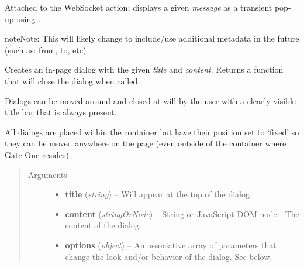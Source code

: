 \documentclass[letterpaper,10pt,openany]{sphinxmanual}
\begin{document}
\begin{fulllineitems}
\begin{fulllineitems}
\begin{fulllineitems}
\end{fulllineitems}



\begin{fulllineitems}
\label{Developer/js_gateone:GateOne.Visual.userMessageAction}
Attached to the  WebSocket action; displays a given \emph{message} as a transient pop-up using {\hyperref[Developer/js_gateone:GateOne.Visual.displayMessage]{}}.

\begin{notice}{note}{Note:}
This will likely change to include/use additional metadata in the future (such as: from, to, etc)
\end{notice}

\end{fulllineitems}



\begin{fulllineitems}
\label{Developer/js_gateone:GateOne.Visual.dialog}
Creates an in-page dialog with the given \emph{title} and \emph{content}.  Returns a function that will close the dialog when called.

Dialogs can be moved around and closed at-will by the user with a clearly visible title bar that is always present.

All dialogs are placed within the  container but have their position set to `fixed' so they can be moved anywhere on the page (even outside of the container where Gate One resides).
\begin{quote}\begin{description}
\item[{Arguments}] \leavevmode\begin{itemize}
\item {} 
\textbf{title} (\emph{string}) -- Will appear at the top of the dialog.

\item {} 
\textbf{content} (\emph{stringOrNode}) -- String or JavaScript DOM node - The content of the dialog.

\item {} 
\textbf{options} (\emph{object}) -- An associative array of parameters that change the look and/or behavior of the dialog.  See below.


\end{itemize}
\end{description}
\end{quote}
\end{fulllineitems}
\end{fulllineitems}
\end{fulllineitems}
\end{document}
